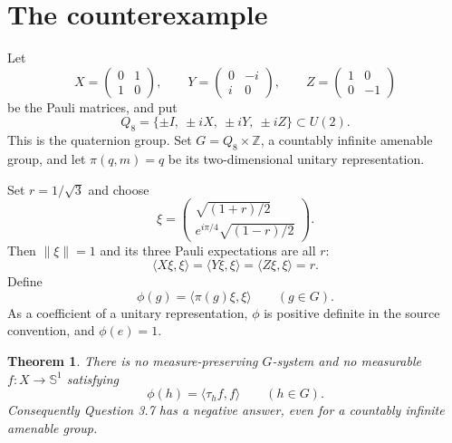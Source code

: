 \documentclass[11pt]{article}
\newtheorem{theorem}{Theorem}
\newcommand{\Z}{\mathbb Z}
\begin{document}
\section{The counterexample}

Let
\[
 X=\begin{pmatrix}0&1\\1&0\end{pmatrix},\qquad
 Y=\begin{pmatrix}0&-i\\i&0\end{pmatrix},\qquad
 Z=\begin{pmatrix}1&0\\0&-1\end{pmatrix}
\]
be the Pauli matrices, and put
\[
 Q_8=\{\pm I,\ \pm iX,\ \pm iY,\ \pm iZ\}\subset U(2).
\]
This is the quaternion group.  Set $G=Q_8\times\Z$, a countably infinite
amenable group, and let $\pi(q,m)=q$ be its two-dimensional unitary
representation.

Set $r=1/\sqrt3$ and choose
\[
 \xi=\begin{pmatrix}
 \sqrt{(1+r)/2}\\[2mm]
 e^{i\pi/4}\sqrt{(1-r)/2}
 \end{pmatrix}.
\]
Then $\|\xi\|=1$ and its three Pauli expectations are all $r$:
\[
 \langle X\xi,\xi\rangle=\langle Y\xi,\xi\rangle
 =\langle Z\xi,\xi\rangle=r.
\]
Define
\[
 \phi(g)=\langle\pi(g)\xi,\xi\rangle\qquad(g\in G).
\]
As a coefficient of a unitary representation, $\phi$ is positive definite in
the source convention, and $\phi(e)=1$.

\begin{theorem}\label{thm:negative}
There is no measure-preserving $G$-system and no measurable
$f:X\to\mathbb S^1$ satisfying
\[
 \phi(h)=\langle\tau_hf,f\rangle\qquad(h\in G).
\]
Consequently Question 3.7 has a negative answer, even for a countably infinite
amenable group.
\end{theorem}
\end{document}
